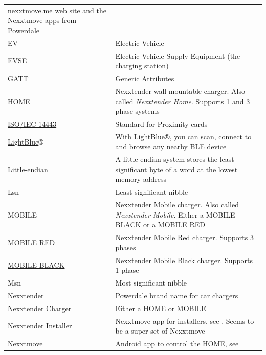 \documentclass[a4paper]{article}
\begin{document}
\begin{longtable}[]{ p{4cm}   p{12cm} }
	nexxtmove.me web site and the Nexxtmove apps from Powerdale \\
	EV & Electric Vehicle \\
	EVSE & Electric Vehicle Supply Equipment (the charging station) \\
	\href{https://software-dl.ti.com/lprf/sdg-latest/html/ble-stack-3.x/gatt.html}{GATT} & Generic Attributes \\
	\href{https://www.cebeo.be/catalog/nl-be/products/powerdale-laadpaal-nexxtender-home-1-4kw-22-kw-t2-cable-7m-rcm-bluetooth-6496973}{HOME}
	& Nexxtender wall mountable charger. Also called \emph{Nexxtender
	Home}. 
	Supports 1 and 3 phase systems \\
	\href{https://en.wikipedia.org/wiki/ISO/IEC_14443}{ISO/IEC 14443} &
	Standard for Proximity cards \\
	\href{https://punchthrough.com/lightblue/}{LightBlue}® & With
	LightBlue®, you can scan, connect to and browse any nearby BLE device \\
	\href{https://en.wikipedia.org/wiki/Endianness}{Little-endian} & A
	little-endian system stores the least significant byte of a word at the
	lowest memory address \\
	Lsn & Least significant nibble \\
	MOBILE 
	& Nexxtender Mobile charger. Also called \emph{Nexxtender Mobile}. Either a MOBILE BLACK or a MOBILE RED \\
	\href{https://www.cebeo.be/catalog/nl-be/products/powerdale-mobile-red-type-2-t2-3f-4kw-11kw-incl-rcm-adapter-to-schuko-plug-6486564}{MOBILE RED}
	& Nexxtender Mobile Red charger. Supports 3 phases \\
	\href{https://www.cebeo.be/catalog/nl-be/products/powerdale-mobile-black-type-2-t2-1f-1-4kw-2-3kw-incl-rcm-6486563}{MOBILE BLACK}
	& Nexxtender Mobile Black charger. Supports 1 phase \\
	Msn & Most significant nibble \\
	Nexxtender & Powerdale brand name for car chargers \\
	Nexxtender Charger & Either a HOME or MOBILE\\
	\href{https://play.google.com/store/apps/details?id=com.powerdale.homeinstaller&hl=en}{Nexxtender
	Installer} & Nexxtmove app for installers, see	\cite{NMIAPP}. 
	Seems to be a	super set of Nexxtmove \\
	\href{https://play.google.com/store/apps/details?id=com.powerdale.nexxtender&hl=en}{Nexxtmove}
	& Android app to control the HOME, see
	\cite{GMNEXT} \\

\end{longtable}
\end{document}

